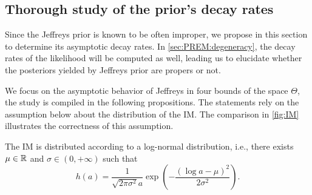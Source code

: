     



    \subsection{Thorough study of the prior's decay rates}\label{sec:PREM:subsec:jeffasymp}


    Since the Jeffreys prior is known to be often improper, we propose in this section to determine its asymptotic decay rates. In   \cref{sec:PREM:degeneracy}, the decay rates of the likelihood will be computed as well, leading us to elucidate whether the posteriors yielded by Jeffreys prior are propers or not.

    We focus on the asymptotic behavior of Jeffreys in four bounds of the space $\Theta$, the study is compiled in the following propositions. 
    The statements rely on the assumption below about the distribution of the IM. %
    The comparison in \cref{fig:IM} illustrates the correctness of this assumption.


    \begin{assu}
        The IM is distributed according to a log-normal distribution, i.e., there exists $\mu\in \mathbb{R}$ and $\sigma\in (0,+\infty)$ such that 
    \begin{equation}
        h(a) = \frac{1}{\sqrt{2\pi\sigma^2}a}\exp\left({-\frac{(\log a-\mu)^2}{2\sigma^2}}\right).
    \end{equation}
    \end{assu}

